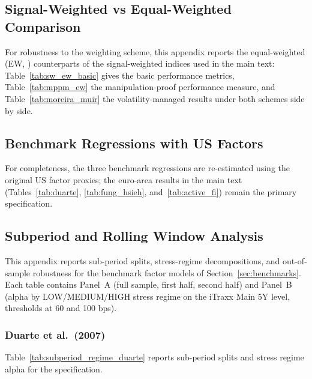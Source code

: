 \subsection{Signal-Weighted vs Equal-Weighted Comparison}
\label{app:sw_ew}

For robustness to the weighting scheme, this appendix reports the
equal-weighted (EW, \citealp{duarte2007risk}) counterparts of the
signal-weighted indices used in the main text:
Table~\ref{tab:sw_ew_basic} gives the basic performance metrics,
Table~\ref{tab:mppm_ew} the manipulation-proof performance measure, and
Table~\ref{tab:moreira_muir} the volatility-managed results under both
schemes side by side.








\subsection{Benchmark Regressions with US Factors}
\label{app:benchmark_us}
For completeness, the three benchmark regressions are re-estimated using the
original US factor proxies; the euro-area results in the main text
(Tables~\ref{tab:duarte}, \ref{tab:fung_hsieh}, and~\ref{tab:active_fi}) remain
the primary specification.





\subsection{Subperiod and Rolling Window Analysis}
\label{app:subperiod}
 
This appendix reports sub-period splits, stress-regime decompositions,
and out-of-sample robustness for the benchmark factor models of
Section~\ref{sec:benchmarks}. Each table contains Panel~A (full sample,
first half, second half) and Panel~B (alpha by LOW/MEDIUM/HIGH stress
regime on the iTraxx Main 5Y level, thresholds at 60 and 100 bps).
 
 
\subsubsection{Duarte et al.\ (2007)}
\label{app:subperiod_duarte}
Table~\ref{tab:subperiod_regime_duarte} reports sub-period splits and stress
regime alpha for the \citet{duarte2007risk} specification.

 

